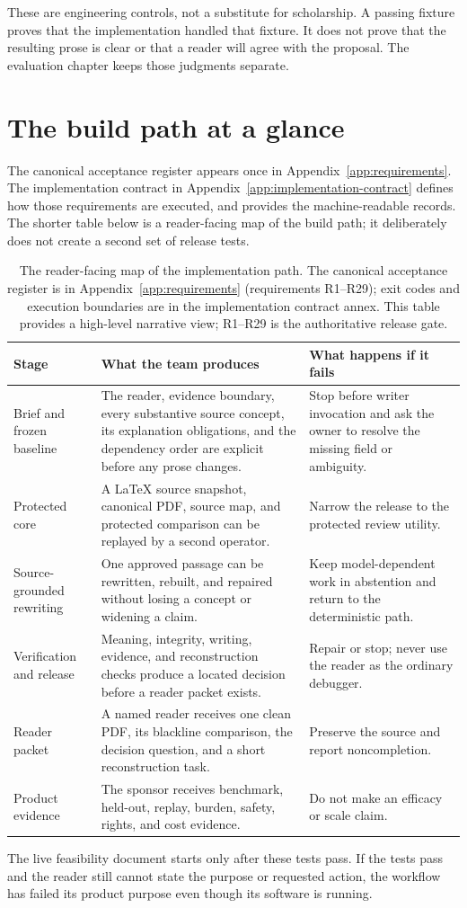 These are engineering controls, not a substitute for scholarship. A passing
fixture proves that the implementation handled that fixture. It does not prove
that the resulting prose is clear or that a reader will agree with the
proposal. The evaluation chapter keeps those judgments separate.

\section{The build path at a glance}
\label{sec:core-acceptance}

The canonical acceptance register appears once in
Appendix~\ref{app:requirements}. The implementation contract in
Appendix~\ref{app:implementation-contract} defines how those requirements
are executed, and  provides the machine-readable records. The
shorter table below is a reader-facing map of the build path; it deliberately
does not create a second set of release tests.

\begin{table}[H]
\centering
\small
\begin{tabularx}{\textwidth}{@{}p{}L p{0.27\textwidth}@{}}
\toprule
Stage & What the team produces & What happens if it fails \\
\midrule
Brief and frozen baseline & The reader, evidence boundary, every substantive
source concept, its explanation obligations, and the dependency order are
explicit before any prose changes. & Stop before writer invocation and ask the
owner to resolve the missing field or ambiguity. \\
Protected core & A LaTeX source snapshot, canonical PDF, source map, and
protected comparison can be replayed by a second operator. & Narrow the release
to the protected review utility. \\
Source-grounded rewriting & One approved passage can be rewritten, rebuilt, and
repaired without losing a concept or widening a claim. & Keep model-dependent
work in abstention and return to the deterministic path. \\
Verification and release & Meaning, integrity, writing, evidence, and
reconstruction checks produce a located decision before a reader packet exists. &
Repair or stop; never use the reader as the ordinary debugger. \\
Reader packet & A named reader receives one clean PDF, its blackline comparison,
the decision question, and a short reconstruction task. & Preserve the source and
report noncompletion. \\
Product evidence & The sponsor receives benchmark, held-out, replay, burden,
safety, rights, and cost evidence. & Do not make an efficacy or scale claim. \\
\bottomrule
\end{tabularx}
\caption{The reader-facing map of the implementation path. The canonical
acceptance register is in Appendix~\ref{app:requirements} (requirements R1--R29);
exit codes and execution boundaries are in the implementation contract annex.
This table provides a high-level narrative view; R1--R29 is the authoritative
release gate.}
\label{tab:build-path-summary}
\end{table}

The live feasibility document starts only after these tests pass. If the tests
pass and the reader still cannot state the purpose or requested action, the
workflow has failed its product purpose even though its software is running.
